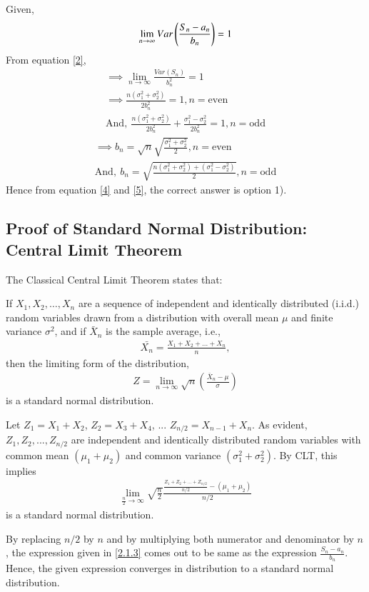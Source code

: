 \documentclass[journal,12pt,twocolumn]{IEEEtran}
\begin{document}
Given,
\begin{align}
    \lim_{n\to\infty}Var\left(\frac{S_n-a_n}{b_n}\right)=1
\end{align}
From equation \eqref{2},
\begin{align}
    \implies \lim_{n\to\infty}\frac{Var(S_n)}{b_n^2}=1\\
    \implies \frac{n(\sigma_1^2+\sigma_2^2)}{2b_n^2}=1,n=\mathrm{even}\\
    \mathrm{And,\:}\frac{n(\sigma_1^2+\sigma_2^2)}{2b_n^2}+\frac{\sigma_1^2-\sigma_2^2}{2b_n^2}=1,n=\mathrm{odd}
    \end{align}
    \begin{align}
    \implies b_n=\sqrt{n}\sqrt{\frac{\sigma_1^2+\sigma_2^2}{2}},n=\mathrm{even}\label{4}\\
    \mathrm{And,\:}b_n=\sqrt{\frac{n(\sigma_1^2+\sigma_2^2)+(\sigma_1^2-\sigma_2^2)}{2}},n=\mathrm{odd}
\end{align}
Hence from equation \eqref{4} and \eqref{5}, the correct answer is option 1).
\subsection{Proof of Standard Normal Distribution: Central Limit Theorem}
The Classical Central Limit Theorem states that:
\par
If ${\textstyle X_{1},X_{2},\dots ,X_{n}}$ are a sequence of independent and identically distributed (i.i.d.) random variables drawn from a distribution with overall mean ${\textstyle \mu }$ and finite variance ${\textstyle \sigma ^{2}}$, and if ${\textstyle {\bar {X}}_{n}}$ is the sample average, i.e.,
\begin{align}
   \bar{X_n}=\frac{X_1+X_2+...+X_n}{n}, 
\end{align}
then the limiting form of the distribution,
\begin{align}
    {\textstyle Z=\lim _{n\to \infty }{\sqrt {n}}{\left({\frac {{\bar {X}}_{n}-\mu }{\sigma }}\right)}}\label{2.1.2}
\end{align}
is a standard normal distribution.\par
Let $Z_1=X_1+X_2$, $Z_2=X_3+X_4$, ... $Z_{n/2}=X_{n-1}+X_n$. As evident, $Z_1,Z_2,...,Z_{n/2}$ are independent and identically distributed random variables with common mean $(\mu_1+\mu_2)$ and common variance $(\sigma_1^2+\sigma_2^2)$.
By CLT, this implies
\begin{align}
    \lim_{\frac{n}{2}\to\infty}\sqrt{\frac{n}{2}}\frac{\frac{Z_1+Z_2+...+Z_{n/2}}{n/2}-(\mu_1+\mu_2)}{n/2}\label{2.1.3}
\end{align}
is a standard normal distribution.\par
By replacing $n/2$ by $n$ and by multiplying both numerator and denominator by $n$, the expression given in \eqref{2.1.3} comes out to be same as the expression $\frac{S_n-a_n}{b_n}$. Hence, the given expression converges in distribution to a standard normal distribution.
\end{document}
